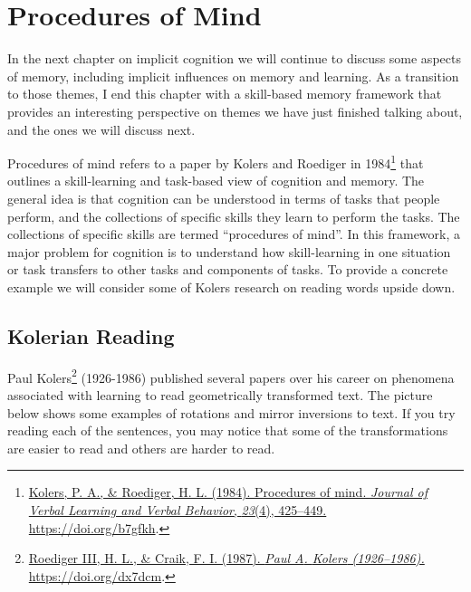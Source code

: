\documentclass[
  oneside,
  12pt]{crumpbook}
\begin{document}
\hypertarget{procedures-of-mind}{%
\section{Procedures of Mind}\label{procedures-of-mind}}

In the next chapter on implicit cognition we will continue to discuss some aspects of memory, including implicit influences on memory and learning. As a transition to those themes, I end this chapter with a skill-based memory framework that provides an interesting perspective on themes we have just finished talking about, and the ones we will discuss next.

Procedures of mind refers to a paper by Kolers and Roediger in 1984\footnote{\protect\hyperlink{ref-kolersProceduresMind1984}{Kolers, P. A., \& Roediger, H. L. (1984). Procedures of mind. \emph{Journal of Verbal Learning and Verbal Behavior}, \emph{23}(4), 425--449. \url{https://doi.org/b7gfkh}}.} that outlines a skill-learning and task-based view of cognition and memory. The general idea is that cognition can be understood in terms of tasks that people perform, and the collections of specific skills they learn to perform the tasks. The collections of specific skills are termed ``procedures of mind''. In this framework, a major problem for cognition is to understand how skill-learning in one situation or task transfers to other tasks and components of tasks. To provide a concrete example we will consider some of Kolers research on reading words upside down.

\hypertarget{kolerian-reading}{%
\subsection{Kolerian Reading}\label{kolerian-reading}}

Paul Kolers\footnote{\protect\hyperlink{ref-roedigeriiiPaulKolers19261987}{Roediger III, H. L., \& Craik, F. I. (1987). \emph{Paul {A}. {Kolers} (1926--1986).} \url{https://doi.org/dx7dcm}}.} (1926-1986) published several papers over his career on phenomena associated with learning to read geometrically transformed text. The picture below shows some examples of rotations and mirror inversions to text. If you try reading each of the sentences, you may notice that some of the transformations are easier to read and others are harder to read.
\end{document}
